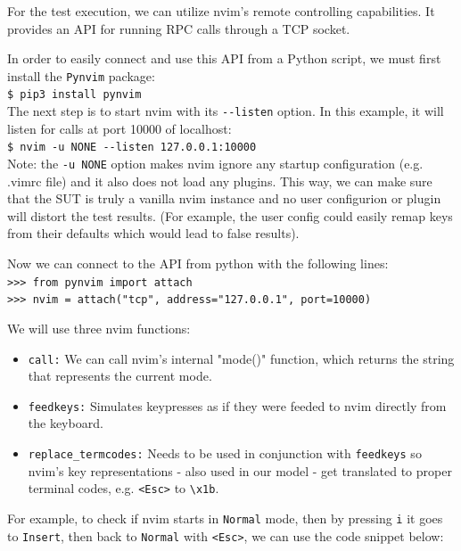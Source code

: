 \documentclass[12pt]{article}
\begin{document}
			For the test execution, we can utilize nvim's remote controlling capabilities. It provides an API \cite{nvim-api} for running RPC calls through a TCP socket.

			In order to easily connect and use this API from a Python script, we must first install the \verb|Pynvim| package:\\

			\verb|$ pip3 install pynvim|\\

			The next step is to start nvim with its \verb|--listen| option. In this example, it will listen for calls at port 10000 of localhost:\\

			\verb|$ nvim -u NONE --listen 127.0.0.1:10000|\\

			Note: the \verb|-u NONE| option makes nvim ignore any startup configuration (e.g. .vimrc file) and it also does not load any plugins. This way, we can make sure that the SUT is truly a vanilla nvim instance and no user configurion or plugin will distort the test results. (For example, the user config could easily remap keys from their defaults which would lead to false results).

			Now we can connect to the API from python with the following lines:\\

			{\parindent0pt
			\verb|>>> from pynvim import attach|\\
			\verb|>>> nvim = attach("tcp", address="127.0.0.1", port=10000)|\\
			}

			We will use three nvim functions:

			\begin{itemize}
				\item{\verb|call:| We can call nvim's internal "mode()" function, which returns the string that represents the current mode.}
				\item{\verb|feedkeys:| Simulates keypresses as if they were feeded to nvim directly from the keyboard.}
				\item{\verb|replace_termcodes:| Needs to be used in conjunction with \verb|feedkeys| so nvim's key representations - also used in our model - get translated to proper terminal codes, e.g. \verb|<Esc>| to \verb|\x1b|.}
			\end{itemize}

			For example, to check if nvim starts in \verb|Normal| mode, then by pressing \verb|i| it goes to \verb|Insert|, then back to \verb|Normal| with \verb|<Esc>|, we can use the code snippet below:\\
\end{document}
